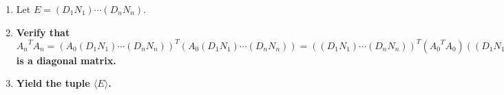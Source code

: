 \documentclass[twocolumn]{article}
\begin{document}
\begin{enumerate}
\begin{enumerate}
					\item Using \hyperref[sec:algorithm 8]{algorithm 8}, verify that $C_n(N_i)=1\ne 0$.
					\item Let $A_i=A_{i-1}D_iN_i$.
					\item \textbf{Verify that $C_n(A_i)=C_n(A_{i-1}D_iN_i)=C_n(A_{i-1})C_n(D_i)C_n(N_i)=C_n(A_{i-1})C_n(D_i)\ne 0$}.
					\item Verify that ${A_{i-1}}^TA_i=({A_{i-1}}^TA_{i-1})D_iN_i$ is a matrix with $0$s from position $(i,i+1)$ to $(i,n)$.
					\item \textbf{Verify that ${A_i}^TA_i=(A_{i-1}D_iN_i)^T(A_{i-1}D_iN_i)={N_i}^T{D_i}^T({A_{i-1}}^TA_{i-1})D_iN_i$ is a matrix with $0$s from position $(i,i+1)$ to $(i,n)$ and from position $(i+1,i)$ to $(n,i)$.}
					\item Verify that $A_i=A_0(D_1N_1)\cdots (D_iN_i)$.
					\item Verify that $MA_i=(D_1N_1)\cdots (D_iN_i)$.
					\item For $j=1$ to $j=n$, do the following:
					\begin{enumerate}
						\item Using \hyperref[sec:algorithm 49]{algorithm 49}, verify that $({e_j}^TM)(A_ie_j)={e_j}^T(MA_i)e_j={e_j}^T((D_1N_1)\cdots (D_iN_i))e_j=({D_1}_{j,j}{N_1}_{j,j})\cdots ({D_i}_{j,j}{N_i}_{j,j})$.
						\item \textbf{Therefore using (5d) verify that $({e_j}^TM)(A_ie_j)={D_1}_{j,j}\cdots {D_i}_{j,j}={D_1}_{j,j}\cdots {D_{\min(i,j-1)}}_{j,j}=\lVert A_0e_1\rVert^2\cdots\lVert A_{\min(i,j-1)-1}e_{\min(i,j-1)}\rVert^2$.}
					\end{enumerate}
				\end{enumerate}
				\item Let $E=(D_1N_1)\cdots (D_nN_n)$.
				\item \textbf{Verify that ${A_n}^TA_n=(A_0(D_1N_1)\cdots (D_nN_n))^T(A_0(D_1N_1)\cdots (D_nN_n))=((D_1N_1)\cdots (D_nN_n))^T({A_0}^TA_0)((D_1N_1)\cdots (D_nN_n))=E^T({A_0}^TA_0)E$ is a diagonal matrix.}
				\item \textbf{Yield the tuple $\langle E\rangle$.}
			\end{enumerate}
\end{document}
